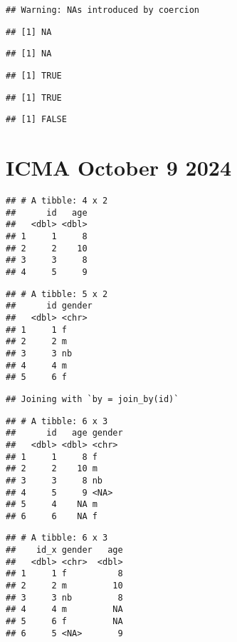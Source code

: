 \documentclass[
]{article}
\begin{document}
\begin{verbatim}
## Warning: NAs introduced by coercion
\end{verbatim}

\begin{verbatim}
## [1] NA
\end{verbatim}

\begin{verbatim}
## [1] NA
\end{verbatim}

\begin{verbatim}
## [1] TRUE
\end{verbatim}

\begin{verbatim}
## [1] TRUE
\end{verbatim}

\begin{verbatim}
## [1] FALSE
\end{verbatim}

\section{ICMA October 9 2024}\label{icma-october-9-2024}

\begin{verbatim}
## # A tibble: 4 x 2
##      id   age
##   <dbl> <dbl>
## 1     1     8
## 2     2    10
## 3     3     8
## 4     5     9
\end{verbatim}

\begin{verbatim}
## # A tibble: 5 x 2
##      id gender
##   <dbl> <chr> 
## 1     1 f     
## 2     2 m     
## 3     3 nb    
## 4     4 m     
## 5     6 f
\end{verbatim}

\begin{verbatim}
## Joining with `by = join_by(id)`
\end{verbatim}

\begin{verbatim}
## # A tibble: 6 x 3
##      id   age gender
##   <dbl> <dbl> <chr> 
## 1     1     8 f     
## 2     2    10 m     
## 3     3     8 nb    
## 4     5     9 <NA>  
## 5     4    NA m     
## 6     6    NA f
\end{verbatim}

\begin{verbatim}
## # A tibble: 6 x 3
##    id_x gender   age
##   <dbl> <chr>  <dbl>
## 1     1 f          8
## 2     2 m         10
## 3     3 nb         8
## 4     4 m         NA
## 5     6 f         NA
## 6     5 <NA>       9
\end{verbatim}
\end{document}
